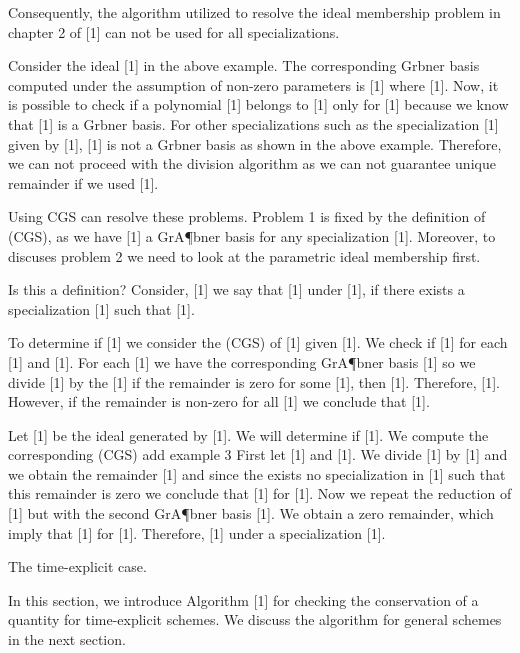 \documentclass{article}
\begin{document}
{    
     Consequently, the algorithm utilized to resolve the ideal membership 
    problem in chapter 2 of [1] can not be used for all specializations. 
    
    
        
        Consider the ideal [1] in the above example. The corresponding Gr{}bner basis computed under the assumption of non-zero parameters
        is [1] where [1]. 
        Now, it is possible to check if a polynomial [1] belongs to [1] only for [1]     
        because we know that [1] is a Gr{}bner basis. For other specializations such as 
        the specialization [1] given by [1], [1] is not a Gr{}bner basis as shown in the above example. 
        Therefore, we can not proceed with the division algorithm as we can not guarantee unique remainder if we used [1].  
    




Using CGS can resolve these problems. Problem 1 is fixed by the definition of (CGS), as we have [1] a 
 GrA¶bner basis for any specialization [1]. Moreover, 
 to discuses problem 2 we need to look at the parametric ideal membership first.

{  Is this a definition?}
 Consider, [1] we say that [1] under [1], if there exists a specialization 
 [1] such that [1].

To determine if [1] we consider the (CGS) of [1] given [1]. 
We check if [1] for each [1] and [1].
For each [1] we have the corresponding GrA¶bner basis [1]
so we divide [1] by the [1] if the remainder is zero for some [1],
then [1]. Therefore, [1]. However, if the remainder is non-zero for all [1] we conclude that 
[1].


	Let [1] be the ideal generated by 
    [1].
	We will determine if [1].
	We compute the corresponding (CGS)
	{  add example 3}
	First let [1] and [1]. 
	We divide [1] by [1] and we obtain the remainder [1] and 
	since the exists no specialization in [1] such that this remainder is zero we conclude that [1] for
	[1]. Now we repeat the reduction of [1] but with the second GrA¶bner basis [1]. We obtain a zero remainder, which imply that 
	[1] for [1]. Therefore, [1] under a specialization [1].









The time-explicit case.



In this section, we introduce Algorithm [1]  for checking the conservation of a quantity for time-explicit schemes. We discuss the algorithm for general schemes in the next section.

}
\end{document}
